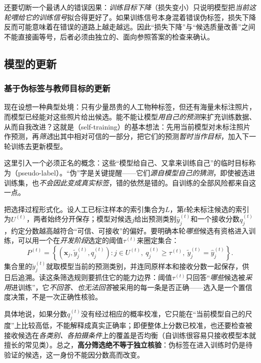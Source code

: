 还要切断一个最诱人的错误因果：\emph{训练目标下降}（损失变小）只说明模型把\emph{当前这轮喂给它的训练信号}拟合得更好了。如果训练信号本身混着错误伪标签，损失下降反而可能意味着在错误的道路上越走越远。因此“损失下降”与“候选质量改善”之间不能直接画等号，后者必须由独立的、面向参照答案的检查来确认。

\subsection{模型的更新}
\label{sec:knowledge-acquisition-model-update}

\subsubsection{基于伪标签与教师目标的更新}
\label{sec:ka-pseudo-label-update}

现在设想一种典型处境：只有少量昂贵的人工物种标签，但还有海量未标注照片，而模型已经能对这些照片给出候选。能不能让模型\emph{用自己的预测}来扩充训练数据、从而自我改进？这就是（self-training）的基本想法：先用当前模型对未标注照片作预测，再\emph{筛选}出其中相对可信的一部分，把它们的预测\emph{暂时当作目标}，加入下一轮训练去更新模型。

这里引入一个必须正名的概念：这些“模型给自己、又拿来训练自己”的临时目标称为（pseudo-label）。“伪”字是关键提醒——它们\emph{源自模型自己的猜测}，即使被选进训练集，也\emph{不会因此变成真实标签}，错的依然是错的。自训练的全部风险都来自这一点。

把选择过程形式化。设人工已标注样本的索引集合为$L$，第$t$轮未标注候选的索引为$U^{(t)}$，两者始终分开保存；模型对候选$j$给出预测类别$\widehat y_j^{(t)}$和一个接收分数$q_j^{(t)}$，约定分数越高越符合“可信、可接收”的偏好。要明确本轮\emph{哪些}候选有资格进入训练，可以用一个在\emph{开发阶段}选定的阈值$\tau^{(t)}$来圈定集合：
\begin{equation}
  P^{(t)}
  =
  \left\{
    \left(\bm{x}_j,\widetilde y_j^{(t)},q_j^{(t)}\right)
    :
    j\in U^{(t)},\
    q_j^{(t)}\geq\tau^{(t)},\
    \widetilde y_j^{(t)}=\widehat y_j^{(t)}
  \right\}.
  \label{eq:knowledge-acquisition-pseudo-label-set}
\end{equation}
集合里的$\widetilde y_j^{(t)}$就取模型当前的预测类别，并连同原样本和接收分数一起保存，供日后追溯。读这条筛选规则要抓住它的能力边界：阈值$\tau^{(t)}$只回答“\emph{哪些}候选被\emph{采用}进训练”，它\emph{不回答、也无法回答}被采用的每一条是否正确——选入是一个置信度决策，不是一次正确性核验。

具体地说，如果分数$q_j^{(t)}$没有经过相应的概率校准，它只能在“当前模型自己的尺度”上比较高低，不能解释成真实正确率；即便整体上分数已校准，也还要检查被接收候选在\emph{各类别、各拍摄条件}上的覆盖是否均衡（自训练很容易只接收模型本就擅长的常见类）。总之，\textbf{高分筛选绝不等于独立核验}：伪标签在进入训练时仍是待验证的候选，这一身份不能因分数高而改变。


